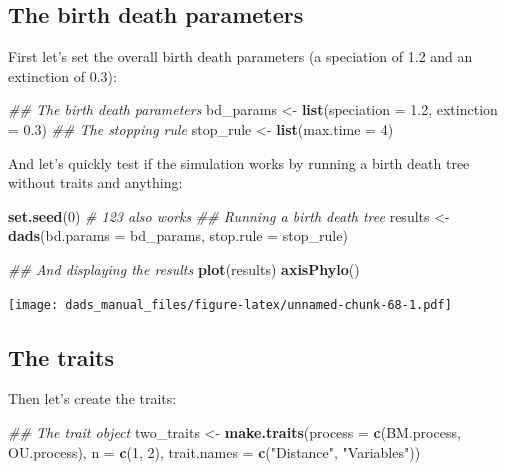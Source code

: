 \documentclass[]{book}
\newenvironment{Shaded}{\begin{snugshade}}{\end{snugshade}}
\newcommand{\CommentTok}[1]{\textcolor[rgb]{0.56,0.35,0.01}{\textit{#1}}}
\newcommand{\DataTypeTok}[1]{\textcolor[rgb]{0.13,0.29,0.53}{#1}}
\newcommand{\DecValTok}[1]{\textcolor[rgb]{0.00,0.00,0.81}{#1}}
\newcommand{\FloatTok}[1]{\textcolor[rgb]{0.00,0.00,0.81}{#1}}
\newcommand{\KeywordTok}[1]{\textcolor[rgb]{0.13,0.29,0.53}{\textbf{#1}}}
\newcommand{\NormalTok}[1]{#1}
\newcommand{\StringTok}[1]{\textcolor[rgb]{0.31,0.60,0.02}{#1}}
\begin{document}
\hypertarget{the-birth-death-parameters}{%
\subsection{The birth death parameters}\label{the-birth-death-parameters}}

First let's set the overall birth death parameters (a speciation of 1.2 and an extinction of 0.3):

\begin{Shaded}
\begin{Highlighting}[]
\CommentTok{## The birth death parameters}
\NormalTok{bd_params <-}\StringTok{ }\KeywordTok{list}\NormalTok{(}\DataTypeTok{speciation =} \FloatTok{1.2}\NormalTok{, }\DataTypeTok{extinction =} \FloatTok{0.3}\NormalTok{)}
\CommentTok{## The stopping rule}
\NormalTok{stop_rule <-}\StringTok{ }\KeywordTok{list}\NormalTok{(}\DataTypeTok{max.time =} \DecValTok{4}\NormalTok{)}
\end{Highlighting}
\end{Shaded}

And let's quickly test if the simulation works by running a birth death tree without traits and anything:

\begin{Shaded}
\begin{Highlighting}[]
\KeywordTok{set.seed}\NormalTok{(}\DecValTok{0}\NormalTok{) }\CommentTok{# 123 also works}
\CommentTok{## Running a birth death tree }
\NormalTok{results <-}\StringTok{ }\KeywordTok{dads}\NormalTok{(}\DataTypeTok{bd.params =}\NormalTok{ bd_params,}
                \DataTypeTok{stop.rule =}\NormalTok{ stop_rule)}

\CommentTok{## And displaying the results}
\KeywordTok{plot}\NormalTok{(results)}
\KeywordTok{axisPhylo}\NormalTok{()}
\end{Highlighting}
\end{Shaded}

\texttt{[image: dads\_manual\_files/figure-latex/unnamed-chunk-68-1.pdf]}

\hypertarget{the-traits}{%
\subsection{The traits}\label{the-traits}}

Then let's create the traits:

\begin{Shaded}
\begin{Highlighting}[]
\CommentTok{## The trait object}
\NormalTok{two_traits <-}\StringTok{ }\KeywordTok{make.traits}\NormalTok{(}\DataTypeTok{process =} \KeywordTok{c}\NormalTok{(BM.process, OU.process), }\DataTypeTok{n =} \KeywordTok{c}\NormalTok{(}\DecValTok{1}\NormalTok{, }\DecValTok{2}\NormalTok{),}
                          \DataTypeTok{trait.names =} \KeywordTok{c}\NormalTok{(}\StringTok{"Distance"}\NormalTok{, }\StringTok{"Variables"}\NormalTok{))}
\end{Highlighting}
\end{Shaded}
\end{document}
